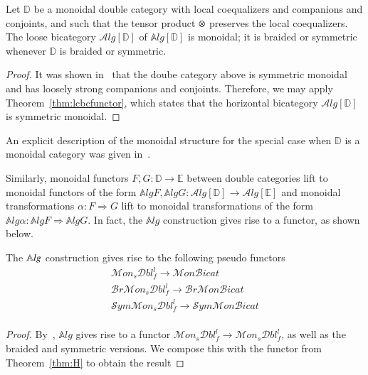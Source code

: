 \begin{prop}\label{thm:eqcomp}
Let $\mathbb{D}$ be a monoidal double category with local coequalizers and companions and conjoints, and such that the tensor product $\otimes$ preserves the local coequalizers. The loose bicategory $\mathcal{A}lg[\mathbb{D}]$ of $\mathbb{A}lg[\mathbb{D}]$ is monoidal; it is braided or symmetric whenever $\mathbb{D}$ is braided or symmetric.
\end{prop}

\begin{proof}
It was shown in~\cite[Examples 9.2]{shulman:frbi} that the doube category above is symmetric monoidal and has loosely strong companions and conjoints. Therefore, we may apply Theorem~\ref{thm:lcbcfunctor}, which states that the horizontal bicategory $\mathcal{A}lg[\mathbb{D}]$ is symmetric monoidal.
\end{proof}


An explicit description of the monoidal structure for the special case when ${\mathbb{D}}$ is a monoidal category was given in~\cite{westerPhDthesis}. 

Similarly, monoidal functors $F,G:\mathbb{D} \rightarrow \mathbb{E}$ between double categories lift to monoidal functors of the form $\mathbb{A}lgF,\mathbb{A}lgG: \mathcal{A}lg[\mathbb{D}] \rightarrow \mathcal{A}lg[\mathbb{E}]$ and monoidal transformations $\alpha: F \Rightarrow G$ lift to monoidal transformations of the form $\mathbb{A}lg\alpha: \mathbb{A}lgF \Rightarrow \mathbb{A}lgG$. In fact, the $\mathbb{A}lg$ construction gives rise to a functor, as shown below. 

\begin{prop}\label{prop:funcAlg}
The $\mathbb{A}\mathit{lg}$ construction gives rise to the following pseudo functors
\begin{align*}
\mathcal{M}on_s\mathcal{D}bl^l _f\rightarrow \mathcal{M}on\mathcal{B}icat\\
\mathcal{B}r\mathcal{M}on_s\mathcal{D}bl^l_f \rightarrow \mathcal{B}r\mathcal{M}on\mathcal{B}icat\\
\mathcal{S}ym\mathcal{M}on_s\mathcal{D}bl^l_f \rightarrow \mathcal{S}ym\mathcal{M}on\mathcal{B}icat\\
\end{align*}
\end{prop}

\begin{proof}
By~\cite[Proposition11.22]{shulman:frbi}, $\mathbb{A}lg$ gives rise to a functor $\mathcal{M}on_s\mathcal{D}bl_f^l \rightarrow \mathcal{M}on_s \mathcal{D}bl_f^l$, as well as the braided and symmetric versions. We compose this with the functor from Theorem~\ref{thm:H} to obtain the result
\end{proof}

